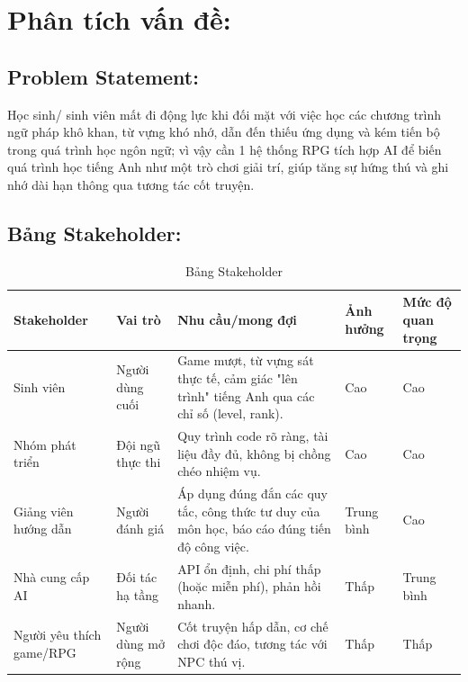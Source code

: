 \section{Phân tích vấn đề:}
\subsection{Problem Statement:}
Học sinh/ sinh viên mất đi động lực khi đối mặt với việc học các chương trình ngữ pháp khô khan, từ vựng khó nhớ, dẫn đến thiếu ứng dụng và kém tiến bộ trong quá trình học ngôn ngữ; vì vậy cần 1 hệ thống RPG tích hợp AI để biến quá trình học tiếng Anh như một trò chơi giải trí, giúp tăng sự hứng thú và ghi nhớ dài hạn thông qua tương tác cốt truyện.

\subsection{Bảng Stakeholder:}


\begin{table}[H]
\centering
\caption{Bảng Stakeholder}
\renewcommand{\arraystretch}{1.5} %
\begin{tabularx}{\textwidth}{|>{\raggedright\arraybackslash}p{2.5cm}|>{\raggedright\arraybackslash}p{2.5cm}|X|>{\centering\arraybackslash}p{1.5cm}|>{\centering\arraybackslash}p{1.8cm}|}
\hline
\textbf{Stakeholder} & \textbf{Vai trò} & \textbf{Nhu cầu/mong đợi} & \textbf{Ảnh hưởng} & \textbf{Mức độ quan trọng} \\ \hline
Sinh viên & Người dùng cuối & Game mượt, từ vựng sát thực tế, cảm giác "lên trình" tiếng Anh qua các chỉ số (level, rank). & Cao & Cao \\ \hline
Nhóm phát triển & Đội ngũ thực thi & Quy trình code rõ ràng, tài liệu đầy đủ, không bị chồng chéo nhiệm vụ. & Cao & Cao \\ \hline
Giảng viên hướng dẫn & Người đánh giá & Áp dụng đúng đắn các quy tắc, công thức tư duy của môn học, báo cáo đúng tiến độ công việc. & Trung bình & Cao \\ \hline
Nhà cung cấp AI & Đối tác hạ tầng & API ổn định, chi phí thấp (hoặc miễn phí), phản hồi nhanh. & Thấp & Trung bình \\ \hline
Người yêu thích game/RPG & Người dùng mở rộng & Cốt truyện hấp dẫn, cơ chế chơi độc đáo, tương tác với NPC thú vị. & Thấp & Thấp \\ \hline
\end{tabularx}
\end{table}

